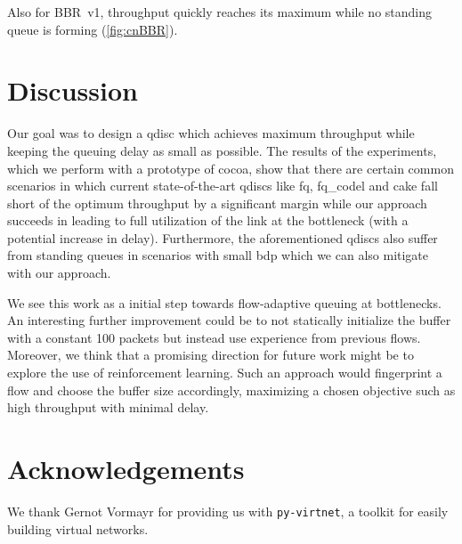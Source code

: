 \documentclass[10pt,sigconf,letterpaper,dvipsnames\ifx\removeHeaders\tempYes ,nonacm\fi]{acmart}
\begin{document}
Also for BBR~v1, throughput quickly reaches its maximum while no standing queue is forming (\autoref{fig:cnBBR}). 

\section{Discussion}

Our goal was to design a \gls{qdisc} which achieves maximum throughput while keeping the queuing delay as small as possible. The results of the experiments, which we perform with a prototype of \gls{cocoa}, show that there are certain common scenarios in which current state-of-the-art \glspl{qdisc} like fq, fq\_codel and cake fall short of the optimum throughput by a significant margin while our approach succeeds in leading to full utilization of the link at the bottleneck (with a potential increase in delay). Furthermore, the aforementioned \glspl{qdisc} also suffer from standing queues in scenarios with small \gls{bdp} which we can also mitigate with our approach. 

We see this work as a initial step towards flow-adaptive queuing at bottlenecks. An interesting further improvement could be to not statically initialize the buffer with a constant 100 packets but instead use experience from previous flows. Moreover, we think that a promising direction for future work might be to explore the use of reinforcement learning. Such an approach would fingerprint a flow and choose the buffer size accordingly, maximizing a chosen objective such as high throughput with minimal delay. 

\section*{Acknowledgements}
We thank Gernot Vormayr for providing us with \texttt{py-virtnet}, a toolkit for easily building virtual networks. 



\end{document}
